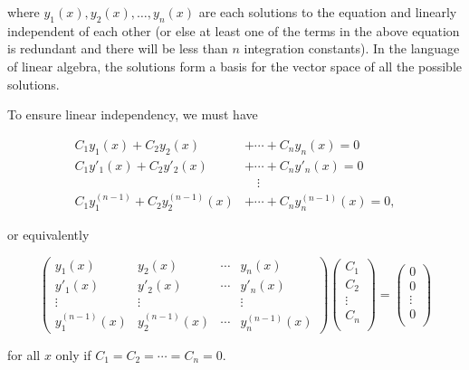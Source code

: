 \documentclass[english,a4paper,12pt]{report}
\begin{document}
where \(y_1 (x), y_2 (x), \ldots , y_{n}(x) \) are each solutions to the equation and linearly independent of each other (or else at least one of the terms in the above equation is redundant and there will be less than \(n\) integration constants). In the language of linear algebra, the solutions form a basis for the vector space of all the possible solutions.

To ensure linear independency, we must have

\begin{equation}
    \begin{aligned}
        C_1 y_1 (x) + C_2 y_2 (x) &+ \cdots + C_{n}y_{n}(x) = 0 \\
        C_1 y'_1 (x) + C_2 y'_2 (x) &+ \cdots + C_{n}y'_{n} (x) = 0 \\
        &\text{~~~} \vdots \\
        C_1 y_1 ^{(n-1)} + C_2 y_2 ^{(n-1)}(x) &+ \cdots + C_{n}y^{(n-1)}_{n}(x) = 0,       
    \end{aligned}
\end{equation}

or equivalently

\begin{equation}
    \begin{pmatrix}
        y_1 (x) & y_2 (x) & \cdots  & y_{n}(x)   \\
        y'_1(x) & y'_2 (x) & \cdots  & y'_{n}(x)   \\
        \vdots  & \vdots  &  & \vdots   \\
        y^{(n-1)}_1(x)  & y^{(n-1)}_2(x)  & \cdots  & y^{(n-1)}_{n} (x)
    \end{pmatrix} 
    \begin{pmatrix}
         C_1  \\
         C_2  \\
         \vdots  \\
         C_{n}  \\
    \end{pmatrix}
    = \begin{pmatrix}
         0 \\
         0 \\
         \vdots  \\
         0 \\
    \end{pmatrix}
\end{equation}

for all \(x\) only if \(C_1 = C_2 = \cdots  = C_{n} = 0 \).
\end{document}

